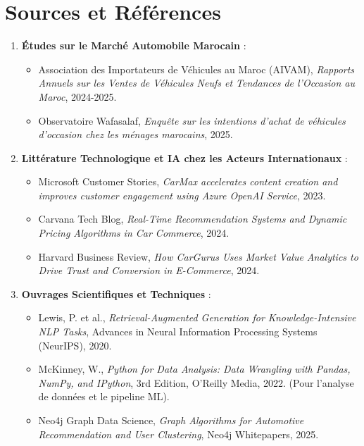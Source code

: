 \documentclass[11pt,a4paper]{article}
\begin{document}
\newpage

\section{Sources et Références}

\begin{enumerate}
    \item \textbf{Études sur le Marché Automobile Marocain} :
    \begin{itemize}
        \item Association des Importateurs de Véhicules au Maroc (AIVAM), \textit{Rapports Annuels sur les Ventes de Véhicules Neufs et Tendances de l'Occasion au Maroc}, 2024-2025.
        \item Observatoire Wafasalaf, \textit{Enquête sur les intentions d'achat de véhicules d'occasion chez les ménages marocains}, 2025.
    \end{itemize}
    
    \item \textbf{Littérature Technologique et IA chez les Acteurs Internationaux} :
    \begin{itemize}
        \item Microsoft Customer Stories, \textit{CarMax accelerates content creation and improves customer engagement using Azure OpenAI Service}, 2023.
        \item Carvana Tech Blog, \textit{Real-Time Recommendation Systems and Dynamic Pricing Algorithms in Car Commerce}, 2024.
        \item Harvard Business Review, \textit{How CarGurus Uses Market Value Analytics to Drive Trust and Conversion in E-Commerce}, 2024.
    \end{itemize}
    
    \item \textbf{Ouvrages Scientifiques et Techniques} :
    \begin{itemize}
        \item Lewis, P. et al., \textit{Retrieval-Augmented Generation for Knowledge-Intensive NLP Tasks}, Advances in Neural Information Processing Systems (NeurIPS), 2020.
        \item McKinney, W., \textit{Python for Data Analysis: Data Wrangling with Pandas, NumPy, and IPython}, 3rd Edition, O'Reilly Media, 2022. (Pour l'analyse de données et le pipeline ML).
        \item Neo4j Graph Data Science, \textit{Graph Algorithms for Automotive Recommendation and User Clustering}, Neo4j Whitepapers, 2025.
    \end{itemize}
\end{enumerate}
\end{document}
